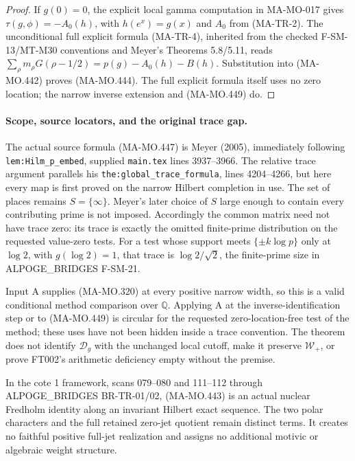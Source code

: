 \begin{proof}
If \(g(0)=0\), the explicit local gamma computation in
MA-MO-017 gives \(\tau(g,\phi)=-A_0(h)\), with
\(h(e^x)=g(x)\) and \(A_0\) from (MA-TR-2).
The unconditional full explicit formula (MA-TR-4), inherited
from the checked F-SM-13/MT-M30 conventions and Meyer's
Theorems 5.8/5.11, reads
\(\sum_\rho m_\rho G(\rho-1/2)=p(g)-A_0(h)-B(h)\).
Substitution into (MA-MO.442) proves (MA-MO.444).
The full explicit formula itself uses no zero location;
the narrow inverse extension and (MA-MO.449) do.
\end{proof}

\paragraph{Scope, source locators, and the original trace gap.}
The actual source formula (MA-MO.447) is Meyer (2005),
immediately following \texttt{lem:Hilm\_p\_embed}, supplied
\texttt{main.tex} lines 3937--3966. The relative trace argument
parallels his \texttt{the:global\_trace\_formula}, lines
4204--4266, but here every map is first proved on the narrow
Hilbert completion in use. The set of places remains
\(S=\{\infty\}\). Meyer's later choice of \(S\) large
enough to contain every contributing prime is not imposed.
Accordingly the common matrix need not have trace zero:
its trace is exactly the omitted finite-prime distribution
on the requested value-zero tests. For a test whose support
meets \(\{\pm k\log p\}\) only at \(\log2\), with
\(g(\log2)=1\), that trace is \(\log2/\sqrt2\), the finite-prime
size in ALPOGE\_BRIDGES F-SM-21.

Input A supplies (MA-MO.320) at every positive narrow width,
so this is a valid conditional method comparison over
\(\mathbb Q\). Applying A at the inverse-identification
step or to (MA-MO.449) is circular for the requested
zero-location-free test of the method; these uses have not
been hidden inside a trace convention. The theorem does not
identify \(\mathscr D_g\) with the unchanged local cutoff,
make it preserve \(\mathcal W_+\), or prove FT002's
arithmetic deficiency empty without the premise.

In the cote 1 framework, scans 079--080 and 111--112 through
ALPOGE\_BRIDGES BR-TR-01/02, (MA-MO.443) is an actual
nuclear Fredholm identity along an invariant Hilbert exact
sequence. The two polar characters and the full retained
zero-jet quotient remain distinct terms. It creates no
faithful positive full-jet realization and assigns no
additional motivic or algebraic weight structure.
